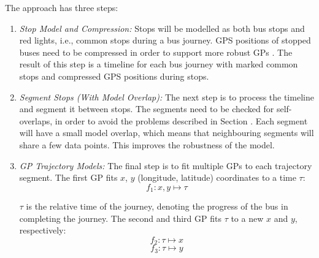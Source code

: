 The approach has three steps:
\begin{enumerate}
    \item \textit{Stop Model and Compression:}
    Stops will be modelled as both bus stops and red lights, i.e., common stops during a bus journey.
    GPS positions of stopped buses need to be compressed in order to support more robust GPs .
    The result of this step is a timeline for each bus journey with marked common stops and compressed GPS positions during stops.

    \item \textit{Segment Stops (With Model Overlap):}
    The next step is to process the timeline and segment it between stops.
    The segments need to be checked for self-overlaps, in order to avoid the problems described in Section .
    Each segment will have a small model overlap, which means that neighbouring segments will share a few data points.
    This improves the robustness of the model.

    \item \textit{GP Trajectory Models:}
    The final step is to fit multiple GPs to each trajectory segment.
    The first GP fits $x$, $y$ (longitude, latitude) coordinates to a time $\tau$:
    \begin{equation}
       f_1: x, y \longmapsto \tau
    \end{equation}
    
    $\tau$ is the relative time of the journey, denoting the progress of the bus in completing the journey.
    The second and third GP fits $\tau$ to a new $x$ and $y$, respectively:
    \begin{equation}
        f_2: \tau \longmapsto x
    \end{equation}
    \begin{equation}
        f_3: \tau \longmapsto y
    \end{equation}
\end{enumerate}
